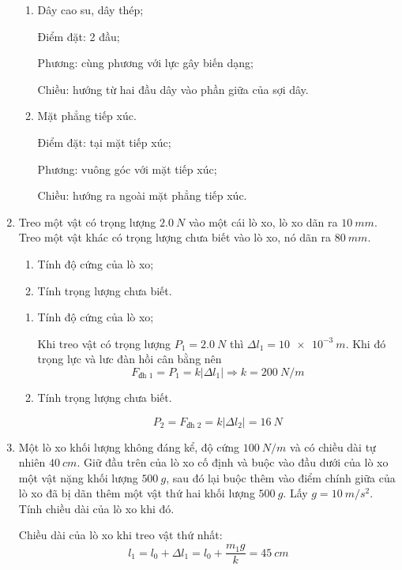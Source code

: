 \begin{enumerate}[label=\bfseries Câu \arabic*:]
{\begin{enumerate}
			\item Dây cao su, dây thép;
			
			Điểm đặt: 2 đầu;
			
			Phương: cùng phương với lực gây biến dạng;
			
			Chiều: hướng từ hai đầu dây vào phần giữa của sợi dây.
			
			\item Mặt phẳng tiếp xúc.
			
			Điểm đặt: tại mặt tiếp xúc;
			
			Phương: vuông góc với mặt tiếp xúc;
			
			Chiều: hướng ra ngoài mặt phẳng tiếp xúc.
		\end{enumerate}
	}
	\item {}
	
	\cauhoi
	{Treo một vật có trọng lượng $\SI{2.0}{N}$ vào một cái lò xo, lò xo dãn ra $\SI{10}{mm}$. Treo một vật khác có trọng lượng chưa biết vào lò xo, nó dãn ra $\SI{80}{mm}$.
	\begin{enumerate}
		\item Tính độ cứng của lò xo;
		\item Tính trọng lượng chưa biết.
	\end{enumerate}

	}
	
	\loigiai
	{	\begin{enumerate}
			\item Tính độ cứng của lò xo;
			
	Khi treo vật có trọng lượng $P_1=\SI{2.0}{N}$ thì $\Delta l_1 = \SI{10e-3}{m}$. Khi đó trọng lực và lưc đàn hồi cân bằng nên
	$$F_\text{đh 1} = P_1 = k |\Delta l_1| \Rightarrow k = \SI{200}{N/m}$$
	
			\item Tính trọng lượng chưa biết.
			
	$$P_2 = F_\text{đh 2} =k |\Delta l_2| = \SI{16}{N} $$
		\end{enumerate}
	}
	\item {}
	
	\cauhoi
	{Một lò xo khối lượng không đáng kể, độ cứng $\SI{100}{N/m}$ và có chiều dài tự nhiên $\SI{40}{cm}$. Giữ đầu trên của lò xo cố định và buộc vào đầu dưới của lò xo một vật nặng khối lượng $\SI{500}{g}$, sau đó lại buộc thêm vào điểm chính giữa của lò xo đã bị dãn thêm một vật thứ hai khối lượng $\SI{500}{g}$. Lấy $g=\SI{10}{m/s^2}$. Tính chiều dài của lò xo khi đó.
	}
	
	\loigiai
	{Chiều dài của lò xo khi treo vật thứ nhất:
		$$l_1 = l_0 + \Delta l_1 = l_0 + \dfrac{m_1g}{k} = \SI{45}{cm}$$
		
}
\end{enumerate}
